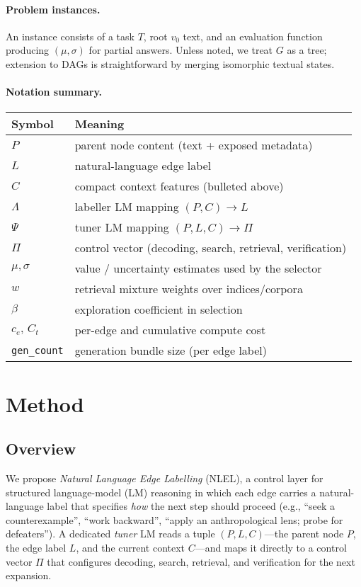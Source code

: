 \documentclass{article}
\theoremstyle{plain}
\theoremstyle{definition}
\theoremstyle{remark}
\begin{document}
\paragraph{Problem instances.}
An instance consists of a task $T$, root $v_0$ text, and an evaluation function producing $(\mu,\sigma)$ for partial answers.
Unless noted, we treat $G$ as a tree; extension to DAGs is straightforward by merging isomorphic textual states.

\paragraph{Notation summary.}
\begin{center}
\begin{tabular}{@{}ll@{}}
\toprule
Symbol & Meaning \\\midrule
$P$ & parent node content (text + exposed metadata) \\
$L$ & natural-language edge label \\
$C$ & compact context features (bulleted above) \\
$\Lambda$ & labeller LM mapping $(P,C)\!\to\!L$ \\
$\Psi$ & tuner LM mapping $(P,L,C)\!\to\!\Pi$ \\
$\Pi$ & control vector (decoding, search, retrieval, verification) \\
$\mu,\sigma$ & value / uncertainty estimates used by the selector \\
$w$ & retrieval mixture weights over indices/corpora \\
$\beta$ & exploration coefficient in selection \\
$c_e,\,C_t$ & per-edge and cumulative compute cost \\
\texttt{gen\_count} & generation bundle size (per edge label) \\
\bottomrule
\end{tabular}
\end{center}

\section{Method}
\label{sec:method}

\subsection{Overview}
We propose \emph{Natural Language Edge Labelling} (NLEL), a control layer for structured language-model (LM) reasoning in which each edge carries a natural-language label that specifies \emph{how} the next step should proceed (e.g., ``seek a counterexample'', ``work backward'', ``apply an anthropological lens; probe for defeaters''). A dedicated \emph{tuner} LM reads a tuple $(P,L,C)$---the parent node $P$, the edge label $L$, and the current context $C$---and maps it directly to a control vector $\Pi$ that configures decoding, search, retrieval, and verification for the next expansion.
\end{document}
